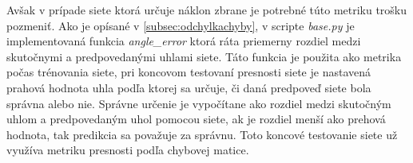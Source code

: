 Avšak v prípade siete ktorá určuje náklon zbrane je potrebné túto metriku trošku pozmeniť.
Ako je opísané v \ref{subsec:odchylkachyby}, v scripte \textit{base.py} je implementovaná funkcia \textit{angle\_error} ktorá ráta priemerny rozdiel medzi
    skutočnymi a predpovedanými uhlami siete.
Táto funkcia je použita ako metrika počas trénovania siete, pri koncovom testovaní presnosti siete je nastavená prahová hodnota uhla podľa ktorej sa určuje,
    či daná predpoveď siete bola správna alebo nie.
Správne určenie je vypočítane ako rozdiel medzi skutočným uhlom a predpovedaným uhol pomocou siete, ak je rozdiel menší ako prehová hodnota, tak predikcia
    sa považuje za správnu.
Toto koncové testovanie siete už využíva metriku presnosti podľa chybovej matice.
